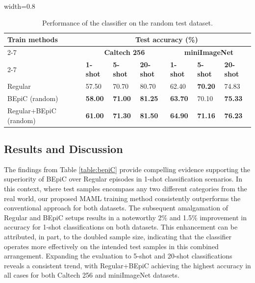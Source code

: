 \begin{table}[!ht]
\centering
\caption{Performance of the classifier on the random test dataset.}
\begin{adjustbox}{width=0.8\linewidth}
\renewcommand{\arraystretch}{1.5} 
\begin{tabular}{|l|l|l|l|l|l|l|}
 \hline
\multirow{3}{*}{\textbf{Train methods}} & \multicolumn{6}{c|}{\textbf{Test accuracy (\%)}}                         \\  \cline{2-7}
                               & \multicolumn{3}{c|}{\textbf{Caltech 256}} & \multicolumn{3}{|c|}{\textbf{miniImageNet}} \\ \cline{2-7}
                               & \textbf{1-shot}  & \textbf{5-shot}  & \textbf{20-shot} & \textbf{1-shot}    & \textbf{5-shot}   & \textbf{20-shot}   \\  \hline
Regular                        & 57.50    & 70.70    & 80.70   & 62.40  &  \textbf{70.20}    &   74.83   \\  \hline
BEpiC (random)                          & \textbf{58.00}    & \textbf{71.00}  & \textbf{81.25}  & \textbf{63.70}    & 70.10     & \textbf{75.33}     \\  \hline
Regular+BEpiC (random)                  & \textbf{61.00}    & \textbf{71.30} & \textbf{81.50}  & \textbf{64.90}    & \textbf{71.16}       & \textbf{76.23}    \\  \hline
\end{tabular}
\end{adjustbox}
\label{table:random}
\end{table}

\subsection{Results and Discussion} \label{results}

The findings from Table \ref{table:bepiC} provide compelling evidence supporting the superiority of BEpiC over Regular episodes in 1-shot classification scenarios. In this context, where test samples encompass any two different categories from the real world, our proposed MAML training method consistently outperforms the conventional approach for both datasets. The subsequent amalgamation of Regular and BEpiC setups results in a noteworthy 2\% and 1.5\% improvement in accuracy for 1-shot classifications on both datasets. This enhancement can be attributed, in part, to the doubled sample size, indicating that the classifier operates more effectively on the intended test samples in this combined arrangement. Expanding the evaluation to 5-shot and 20-shot classifications reveals a consistent trend, with Regular+BEpiC achieving the highest accuracy in all cases for both Caltech 256 and miniImageNet datasets.

